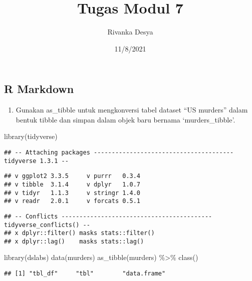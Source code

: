 \documentclass[
]{article}
\title{Tugas Modul 7}
\author{Rivanka Desya}
\date{11/8/2021}
\newenvironment{Shaded}{\begin{snugshade}}{\end{snugshade}}
\newcommand{\FunctionTok}[1]{\textcolor[rgb]{0.00,0.00,0.00}{#1}}
\newcommand{\NormalTok}[1]{#1}
\newcommand{\SpecialCharTok}[1]{\textcolor[rgb]{0.00,0.00,0.00}{#1}}
\providecommand{\tightlist}{%
  \setlength{\itemsep}{0pt}\setlength{\parskip}{0pt}}
\begin{document}
\maketitle

\hypertarget{r-markdown}{%
\subsection{R Markdown}\label{r-markdown}}

\begin{enumerate}
\def\labelenumi{\arabic{enumi}.}
\tightlist
\item
  Gunakan as\_tibble untuk mengkonversi tabel dataset ``US murders''
  dalam bentuk tibble dan simpan dalam objek baru bernama
  `murders\_tibble'.
\end{enumerate}

\begin{Shaded}
\begin{Highlighting}[]
\FunctionTok{library}\NormalTok{(tidyverse)}
\end{Highlighting}
\end{Shaded}

\begin{verbatim}
## -- Attaching packages --------------------------------------- tidyverse 1.3.1 --
\end{verbatim}

\begin{verbatim}
## v ggplot2 3.3.5     v purrr   0.3.4
## v tibble  3.1.4     v dplyr   1.0.7
## v tidyr   1.1.3     v stringr 1.4.0
## v readr   2.0.1     v forcats 0.5.1
\end{verbatim}

\begin{verbatim}
## -- Conflicts ------------------------------------------ tidyverse_conflicts() --
## x dplyr::filter() masks stats::filter()
## x dplyr::lag()    masks stats::lag()
\end{verbatim}

\begin{Shaded}
\begin{Highlighting}[]
\FunctionTok{library}\NormalTok{(dslabs)}
\FunctionTok{data}\NormalTok{(murders)}
\FunctionTok{as\_tibble}\NormalTok{(murders) }\SpecialCharTok{\%\textgreater{}\%} \FunctionTok{class}\NormalTok{()}
\end{Highlighting}
\end{Shaded}

\begin{verbatim}
## [1] "tbl_df"     "tbl"        "data.frame"
\end{verbatim}
\end{document}
